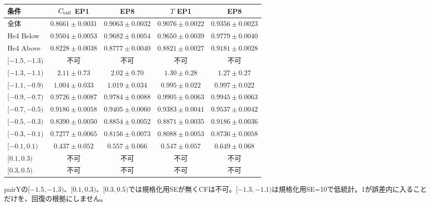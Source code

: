 \documentclass[11pt,a4paper]{article}
\newcommand{\boxnote}[1]{\par\colorbox{pale}{\parbox{\dimexpr\linewidth-5mm\relax}{\vspace{2mm}\small\raggedright #1\vspace{2mm}}}\par}
\begin{document}
\begin{center}\small\begin{tabular}{P{4.1cm}cccc}\toprule

条件 & $C_{\rm tail}$ EP1 & EP8 & $T$ EP1 & EP8\\\midrule

全体 & $0.8661\pm0.0031$ & $0.9063\pm0.0032$ & $0.9076\pm0.0022$ & $0.9356\pm0.0023$\\

He4 Below & $0.9504\pm0.0053$ & $0.9682\pm0.0054$ & $0.9650\pm0.0039$ & $0.9779\pm0.0040$\\

He4 Above & $0.8228\pm0.0038$ & $0.8777\pm0.0040$ & $0.8821\pm0.0027$ & $0.9181\pm0.0028$\\

$[-1.5,-1.3)$ & 不可 & 不可 & 不可 & 不可\\

$[-1.3,-1.1)$ & $2.11\pm0.73$ & $2.02\pm0.70$ & $1.30\pm0.28$ & $1.27\pm0.27$\\

$[-1.1,-0.9)$ & $1.004\pm0.033$ & $1.019\pm0.034$ & $0.995\pm0.022$ & $0.997\pm0.022$\\

$[-0.9,-0.7)$ & $0.9726\pm0.0087$ & $0.9784\pm0.0088$ & $0.9905\pm0.0063$ & $0.9945\pm0.0063$\\

$[-0.7,-0.5)$ & $0.9186\pm0.0058$ & $0.9405\pm0.0060$ & $0.9383\pm0.0041$ & $0.9537\pm0.0042$\\

$[-0.5,-0.3)$ & $0.8390\pm0.0050$ & $0.8854\pm0.0052$ & $0.8871\pm0.0035$ & $0.9186\pm0.0036$\\

$[-0.3,-0.1)$ & $0.7277\pm0.0065$ & $0.8156\pm0.0073$ & $0.8088\pm0.0053$ & $0.8736\pm0.0058$\\

$[-0.1,0.1)$ & $0.437\pm0.052$ & $0.557\pm0.066$ & $0.547\pm0.057$ & $0.649\pm0.068$\\

$[0.1,0.3)$ & 不可 & 不可 & 不可 & 不可\\

$[0.3,0.5)$ & 不可 & 不可 & 不可 & 不可\\

\bottomrule\end{tabular}\end{center}

\boxnote{pairYの$[-1.5,-1.3)$、$[0.1,0.3)$、$[0.3,0.5)$では規格化用SEが無くCFは不可。$[-1.3,-1.1)$は規格化用SE=10で低統計。1が誤差内に入ることだけを、回復の根拠にしません。}
\end{document}
